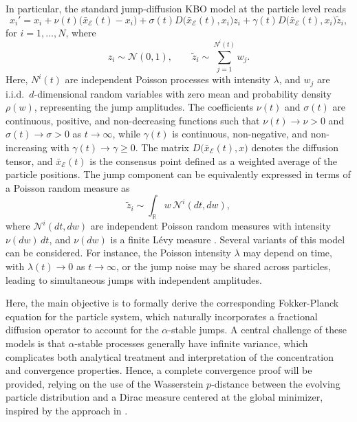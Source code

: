 \documentclass[11pt,handout]{article}%
\numberwithin{equation}{section}
\theoremstyle{definition}
\begin{document}
In particular, the standard jump-diffusion KBO model at the particle level reads
\begin{equation}\label{eq:jump_diffusion}
	x_i' = x_i + \nu(t)\big(\bar{x}_\mathcal{E}(t) - x_i\big) 
	+ \sigma(t) D\big(\bar{x}_\mathcal{E}(t), x_i\big) z_i 
	+ \gamma(t) D\big(\bar{x}_\mathcal{E}(t), x_i\big) \tilde{z}_i,
\end{equation}
for $i=1,\ldots,N$, where
\begin{equation}\label{eq:finite_poisson_measure}
	z_i \sim \mathcal{N}(0,1), 
	\qquad 
	\tilde{z}_i \sim \sum_{j=1}^{N^i(t)} w_j.
\end{equation}
Here, $N^i(t)$ are independent Poisson processes with intensity $\lambda$, and $w_j$ are i.i.d.\ $d$-dimensional random variables with zero mean and probability density $\rho(w)$, representing the jump amplitudes. The coefficients $\nu(t)$ and $\sigma(t)$ are continuous, positive, and non-decreasing functions such that $\nu(t)\to \nu>0$ and $\sigma(t)\to \sigma>0$ as $t\to\infty$, while $\gamma(t)$ is continuous, non-negative, and non-increasing with $\gamma(t)\to \gamma\geq 0$. The matrix $D\big(\bar{x}_\mathcal{E}(t), x\big)$ denotes the diffusion tensor, and $\bar{x}_\mathcal{E}(t)$ is the consensus point defined as a weighted average of the particle positions.
The jump component can be equivalently expressed in terms of a Poisson random measure as
\begin{equation}\label{eq:jump_diffusion_continuos}
	\tilde{z}_i \sim \int_{\mathbb{R}} w \, \mathcal{N}^i(dt,dw),
\end{equation}
where $\mathcal{N}^i(dt,dw)$ are independent Poisson random measures with intensity $\nu(dw)\,dt$, and $\nu(dw)$ is a finite L\'evy measure \cite{ken1999levy,applebaum2009levy}.
Several variants of this model can be considered. For instance, the Poisson intensity $\lambda$ may depend on time, with $\lambda(t)\to 0$ as $t\to\infty$, or the jump noise may be shared across particles, leading to simultaneous jumps with independent amplitudes. 

Here, the main objective is to formally derive the corresponding Fokker-Planck equation for the particle system, which naturally incorporates a fractional diffusion operator to account for the $\alpha$-stable jumps. A central challenge of these models is that $\alpha$-stable processes generally have infinite variance, which complicates both analytical treatment and interpretation of the concentration and convergence properties. Hence, a complete convergence proof will be provided, relying on the use of the Wasserstein $p$-distance between the evolving particle distribution and a Dirac measure centered at the global minimizer, inspired by the approach in \cite{fornasier2024consensus}.
\end{document}
